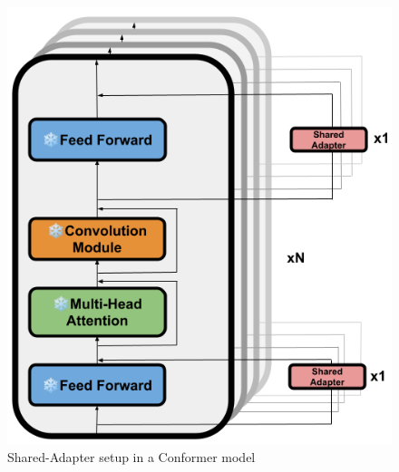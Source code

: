 \begin{figure}
    \begin{center}
        \includegraphics[scale=0.3]{imgs/Shared_Adapters.png}
        \caption{Shared-Adapter setup in a Conformer model}
        \label{fig:Shared_adapter}
    \end{center}
\end{figure}



